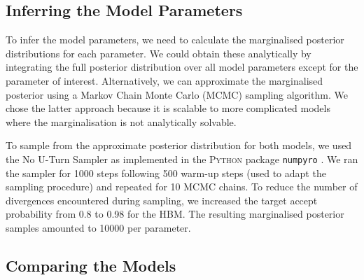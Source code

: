 \subsection{Inferring the Model Parameters}\label{sec:hbm-inf}

To infer the model parameters, we need to calculate the marginalised posterior distributions for each parameter. We could obtain these analytically by integrating the full posterior distribution over all model parameters except for the parameter of interest. Alternatively, we can approximate the marginalised posterior using a Markov Chain Monte Carlo (MCMC) sampling algorithm. We chose the latter approach because it is scalable to more complicated models where the marginalisation is not analytically solvable.

To sample from the approximate posterior distribution for both models, we used the No U-Turn Sampler \citep[NUTS;][]{Hoffman.Gelman2014} as implemented in the \textsc{Python} package \texttt{numpyro} \citep{Phan.Pradhan.ea2019,Bingham.Chen.ea2019}. We ran the sampler for 1000 steps following 500 warm-up steps (used to adapt the sampling procedure) and repeated for 10 MCMC chains. To reduce the number of divergences encountered during sampling, we increased the target accept probability from 0.8 to 0.98 for the HBM. The resulting marginalised posterior samples amounted to \num{10000} per parameter.

\subsection{Comparing the Models}\label{sec:hbm-comp}


